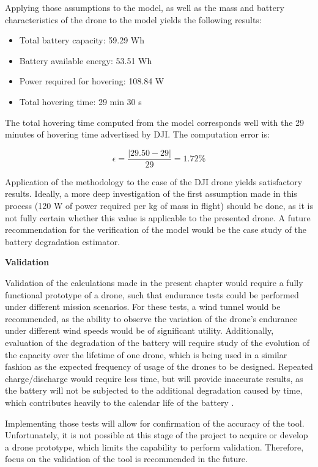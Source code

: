 Applying those assumptions to the model, as well as the mass and battery characteristics of the drone to the model yields the following results:

\begin{itemize}[noitemsep]
    \item Total battery capacity: 59.29 Wh
    \item Battery available energy: 53.51 Wh
    \item Power required for hovering: 108.84 W
    \item Total hovering time: 29 min 30 s
\end{itemize}

The total hovering time computed from the model corresponds well with the 29 minutes of hovering time advertised by DJI. The computation error is:

\begin{equation}
    \epsilon = \frac{\left | 29.50 - 29 \right |}{29} = 1.72\%
\end{equation}

Application of the methodology to the case of the DJI drone yields satisfactory results. Ideally, a more deep investigation of the first assumption made in this process (120 W of power required per kg of mass in flight) should be done, as it is not fully certain whether this value is applicable to the presented drone. A future recommendation for the verification of the model would be the case study of the battery degradation estimator.

\textbf{Validation}

Validation of the calculations made in the present chapter would require a fully functional prototype of a drone, such that endurance tests could be performed under different mission scenarios. For these tests, a wind tunnel would be recommended, as the ability to observe the variation of the drone's endurance under different wind speeds would be of significant utility. Additionally, evaluation of the degradation of the battery will require study of the evolution of the capacity over the lifetime of one drone, which is being used in a similar fashion as the expected frequency of usage of the drones to be designed. Repeated charge/discharge would require less time, but will provide inaccurate results, as the battery will not be subjected to the additional degradation caused by time, which contributes heavily to the calendar life of the battery \cite{battery_life_and_how_to_improve_it}.

Implementing those tests will allow for confirmation of the accuracy of the tool. Unfortunately, it is not possible at this stage of the project to acquire or develop a drone prototype, which limits the capability to perform validation. Therefore, focus on the validation of the tool is recommended in the future.


